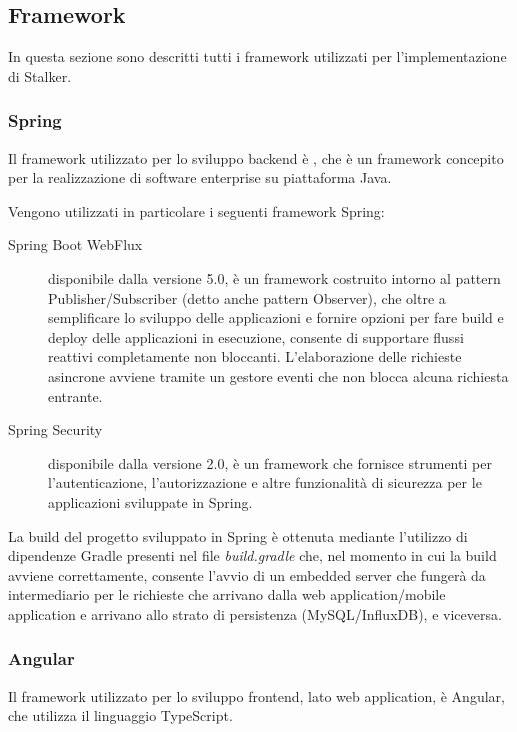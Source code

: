 \documentclass[../manuale-sviluppatore.tex]{subfiles}
\begin{document}
\subsection{Framework}%
\label{sub:framework}
In questa sezione sono descritti tutti i framework utilizzati per l'implementazione di Stalker.

\subsubsection{Spring}%
\label{subs:spring}

Il framework utilizzato per lo sviluppo backend è , che è un framework concepito per la realizzazione di software enterprise su piattaforma Java.

Vengono utilizzati in particolare i seguenti framework Spring:
\begin{description}
  \item[Spring Boot WebFlux] disponibile dalla versione 5.0, è un framework costruito intorno al pattern Publisher/Subscriber (detto anche pattern Observer), che oltre a semplificare lo sviluppo delle applicazioni e fornire opzioni per fare build e deploy delle applicazioni in esecuzione, consente di supportare flussi reattivi completamente non bloccanti. L'elaborazione delle richieste asincrone avviene tramite un gestore eventi che non blocca alcuna richiesta entrante.
  \item[Spring Security] disponibile dalla versione 2.0, è un framework che fornisce strumenti per l'autenticazione, l'autorizzazione e altre funzionalità di sicurezza per le applicazioni sviluppate in Spring.
\end{description}

La build del progetto sviluppato in Spring è ottenuta mediante l'utilizzo di dipendenze Gradle presenti nel file \textit{build.gradle} che, nel momento in cui la build avviene correttamente, consente l'avvio di un embedded server che fungerà da intermediario per le richieste che arrivano dalla web application/mobile application e arrivano allo strato di persistenza (MySQL/InfluxDB), e viceversa.

\subsubsection{Angular}%
\label{subs:angular}

Il framework utilizzato per lo sviluppo frontend, lato web application, è Angular, che utilizza il linguaggio TypeScript.
\end{document}
